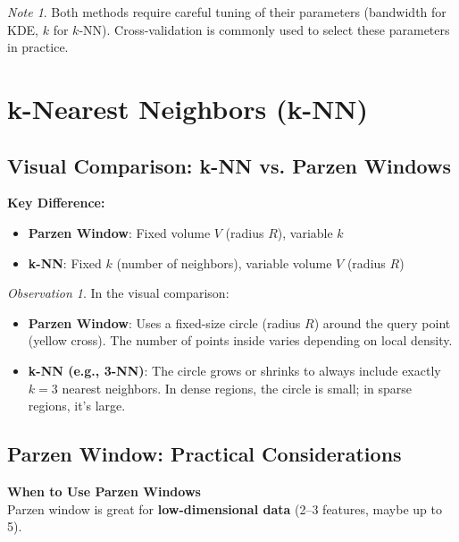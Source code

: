 \documentclass[11pt,a4paper]{article}
\theoremstyle{definition}
\theoremstyle{plain}
\theoremstyle{remark}
\newtheorem*{remark}{Note}
\newtheorem*{observation}{Observation}
\begin{document}
\begin{remark}
Both methods require careful tuning of their parameters (bandwidth for KDE, $k$ for $k$-NN). Cross-validation is commonly used to select these parameters in practice.
\end{remark}

\section{k-Nearest Neighbors (k-NN)}

\subsection{Visual Comparison: k-NN vs. Parzen Windows}

\begin{center}
\colorbox{blue!15}{\parbox{0.9\textwidth}{
\textbf{Key Difference:}
\begin{itemize}
    \item \textbf{Parzen Window}: Fixed volume $V$ (radius $R$), variable $k$
    \item \textbf{k-NN}: Fixed $k$ (number of neighbors), variable volume $V$ (radius $R$)
\end{itemize}
}}
\end{center}

\begin{observation}
In the visual comparison:
\begin{itemize}
    \item \textbf{Parzen Window}: Uses a fixed-size circle (radius $R$) around the query point (yellow cross). The number of points inside varies depending on local density.
    
    \item \textbf{k-NN (e.g., 3-NN)}: The circle grows or shrinks to always include exactly $k=3$ nearest neighbors. In dense regions, the circle is small; in sparse regions, it's large.
\end{itemize}
\end{observation}

\subsection{Parzen Window: Practical Considerations}

\begin{center}
\colorbox{orange!15}{\parbox{0.9\textwidth}{
\textbf{When to Use Parzen Windows}\\[0.2cm]
Parzen window is great for \textbf{low-dimensional data} (2–3 features, maybe up to 5).
}}
\end{center}
\end{document}

